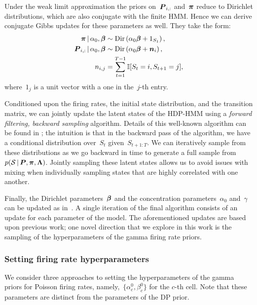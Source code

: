 Under the weak limit approximation the priors on~$\boldsymbol{P}_{i,:}$
and~$\boldsymbol{\pi}$ reduce to Dirichlet distributions, which are also conjugate
with the finite HMM. Hence we can derive conjugate Gibbs updates for
these parameters as well. They take the form:
\begin{align}
\boldsymbol{\pi} \,|\, \alpha_0, \boldsymbol{\beta} &\sim \mathrm{Dir}\left(\alpha_0\boldsymbol{\beta} + 1_{S_1}\right),\\
\nonumber \boldsymbol{P}_{i,:} \,|\, \alpha_0, \boldsymbol{\beta} &\sim \mathrm{Dir}\left(\alpha_0\boldsymbol{\beta} + \boldsymbol{n}_{i}\right),\\
\nonumber n_{i,j}&=\sum_{t=1}^{T-1} \mathbb{I}[S_t=i,S_{t+1}=j],
\end{align}
where~$1_j$ is a unit vector with a one in the~$j$-th entry.

Conditioned upon the firing rates, the initial state distribution, and
the transition matrix, we can jointly update the latent states of the
HDP-HMM using a {\em forward filtering, backward sampling}
algorithm. Details of this well-known algorithm can be found in
\citep{Johnson14b}; the intuition is that in the backward pass of the
algorithm, we have a conditional distribution over~$S_t$
given~$S_{t+1:T}$. We can iteratively sample from these distributions
as we go backward in time to generate a full sample
from~${p(\mathcal{S} \,|\, \boldsymbol{P}, \boldsymbol{\pi}, \boldsymbol{\Lambda})}$. Jointly sampling
these latent states allows us to avoid issues with mixing when
individually sampling states that are highly correlated with one
another.

Finally, the Dirichlet parameters~$\boldsymbol{\beta}$ and the concentration
parameters~$\alpha_0$ and~$\gamma$ can be updated as
in~\citep{Teh06}. A single iteration of the final algorithm consists
of an update for each parameter of the model. The aforementioned
updates are based upon previous work; one novel direction that we
explore in this work is the sampling of the hyperparameters of the
gamma firing rate priors.

\subsubsection{Setting firing rate hyperparameters} 
\label{sec:fr_hypers}
We consider three approaches to setting the hyperparameters of the
gamma priors for Poisson firing rates, namely,~${\{\alpha_c^0,
  \beta_c^0\}}$ for the $c$-th cell.  Note that these parameters are
distinct from the parameters of the DP prior.


